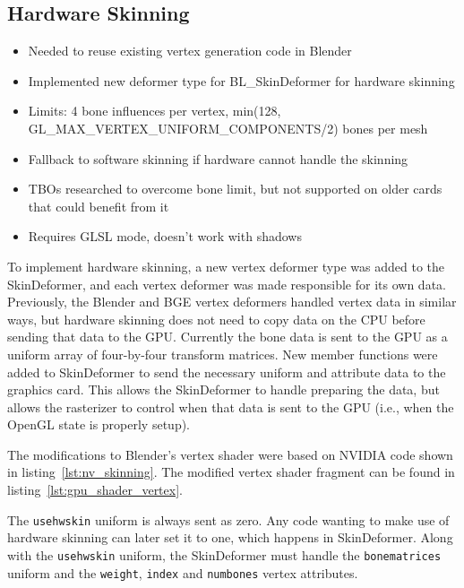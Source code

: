 \subsection{Hardware Skinning}
\ifsummaries
\begin{itemize}
 \item Needed to reuse existing vertex generation code in Blender
 \item Implemented new deformer type for BL\_SkinDeformer for hardware skinning
 \item Limits: 4 bone influences per vertex, min(128, GL\_MAX\_VERTEX\_UNIFORM\_COMPONENTS/2) bones per mesh
 \item Fallback to software skinning if hardware cannot handle the skinning
 \item TBOs researched to overcome bone limit, but not supported on older cards that could benefit from it
 \item Requires GLSL mode, doesn't work with shadows
\end{itemize}
\fi

\label{sec:hardware_skinning}

To implement hardware skinning, a new vertex deformer type was added to the SkinDeformer, and each vertex deformer was made responsible for its own data.
Previously, the Blender and BGE vertex deformers handled vertex data in similar ways, but hardware skinning does not need to copy data on the CPU before sending that data to the GPU.
Currently the bone data is sent to the GPU as a uniform array of four-by-four transform matrices.
New member functions were added to SkinDeformer to send the necessary uniform and attribute data to the graphics card.
This allows the SkinDeformer to handle preparing the data, but allows the rasterizer to control when that data is sent to the GPU (i.e., when the OpenGL state is properly setup).

The modifications to Blender's vertex shader were based on NVIDIA code shown in listing~\ref{lst:nv_skinning}.
The modified vertex shader fragment can be found in listing~\ref{lst:gpu_shader_vertex}.


The \texttt{usehwskin} uniform is always sent as zero.
Any code wanting to make use of hardware skinning can later set it to one, which happens in SkinDeformer.
Along with the \texttt{usehwskin} uniform, the SkinDeformer must handle the \texttt{bonematrices} uniform and the \texttt{weight}, \texttt{index} and \texttt{numbones} vertex attributes.

